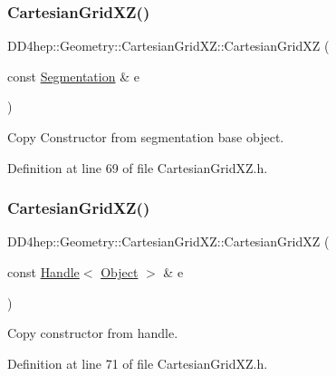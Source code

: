 \subsubsection{\texorpdfstring{Cartesian\+Grid\+X\+Z()}{CartesianGridXZ()}\hspace{0.1cm}{\footnotesize\ttfamily [3/5]}}
{\footnotesize\ttfamily D\+D4hep\+::\+Geometry\+::\+Cartesian\+Grid\+X\+Z\+::\+Cartesian\+Grid\+XZ (\begin{DoxyParamCaption}\item[{const \hyperlink{class_d_d4hep_1_1_geometry_1_1_segmentation}{Segmentation} \&}]{e }\end{DoxyParamCaption})\hspace{0.3cm}{\ttfamily [inline]}}



Copy Constructor from segmentation base object. 



Definition at line 69 of file Cartesian\+Grid\+X\+Z.\+h.

\hypertarget{class_d_d4hep_1_1_geometry_1_1_cartesian_grid_x_z_a2ac7c5874abd765734541bd8adde8ca0}{}\label{class_d_d4hep_1_1_geometry_1_1_cartesian_grid_x_z_a2ac7c5874abd765734541bd8adde8ca0} 
\subsubsection{\texorpdfstring{Cartesian\+Grid\+X\+Z()}{CartesianGridXZ()}\hspace{0.1cm}{\footnotesize\ttfamily [4/5]}}
{\footnotesize\ttfamily D\+D4hep\+::\+Geometry\+::\+Cartesian\+Grid\+X\+Z\+::\+Cartesian\+Grid\+XZ (\begin{DoxyParamCaption}\item[{const \hyperlink{class_d_d4hep_1_1_handle}{Handle}$<$ \hyperlink{class_d_d4hep_1_1_geometry_1_1_cartesian_grid_x_z_aba1e511c43a8b46f2524a1253c660f10}{Object} $>$ \&}]{e }\end{DoxyParamCaption})\hspace{0.3cm}{\ttfamily [inline]}}



Copy constructor from handle. 



Definition at line 71 of file Cartesian\+Grid\+X\+Z.\+h.

